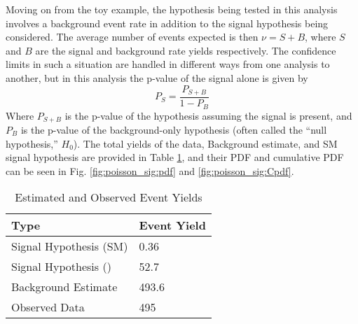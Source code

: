     Moving on from the toy example, the hypothesis being tested in this analysis
        involves a background event rate in addition to the signal hypothesis being considered.
    The average number of events expected is then $\nu = S + B$,
        where $S$ and $B$ are the signal and background rate yields respectively.
    The confidence limits in such a situation are handled in different ways from one analysis to another,
        but in this analysis the p-value of the signal alone is given by
    \begin{equation}
        P_S = \frac{P_{S+B}}{1 - P_B}
    \end{equation}
    Where $P_{S+B}$ is the p-value of the hypothesis assuming the signal is present,
        and $P_B$ is the p-value of the background-only hypothesis
        (often called the ``null hypothesis,'' $H_0$)\cite{Barlow:2019svl}.
    The total yields of the data, Background estimate, and SM signal hypothesis are provided in Table \ref{tab:event_yield},
        and their PDF and cumulative PDF can be seen in
        Fig. \ref{fig:poisson_sig:pdf} and \ref{fig:poisson_sig:Cpdf}.

    \begin{table}[tbh]
       \begin{center}
           \caption{Estimated and Observed Event Yields}
           \label{tab:event_yield}
           \footnotesize
           \begin{tabular}{|l|l|}
           \toprule
               Type  &	Event Yield \\
               \midrule
               Signal Hypothesis (SM) & 0.36 \\
               Signal Hypothesis (\kvv=3) & 52.7 \\
               Background Estimate  & 493.6 \\
               Observed Data & 495 \\
           \bottomrule
           \end{tabular}
       \end{center}
    \end{table}


